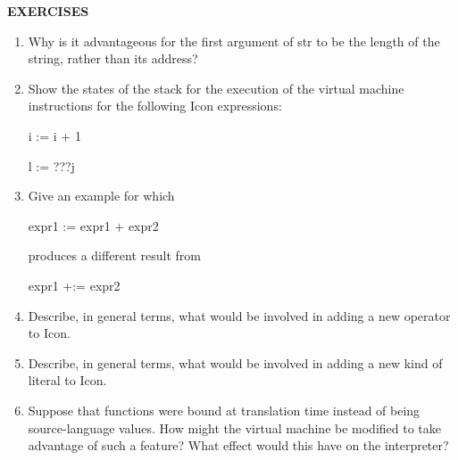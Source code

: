 {\sffamily\bfseries
EXERCISES}

\liststyleLvi
\begin{enumerate}
\item Why is it advantageous for the first argument of str to be the
length of the string, rather than its address?

\item Show the states of the stack for the execution of the virtual
machine instructions for the following Icon expressions:

   i := i + 1

   l := ???j

\item Give an example for which

expr1 := expr1 + expr2

produces a different result from

expr1 +:= expr2

\item Describe, in general terms, what would be involved in adding a
new operator to Icon.

\item Describe, in general terms, what would be involved in adding a
new kind of literal to Icon.

\item Suppose that functions were bound at translation time instead of
being source-language values. How might the virtual machine be
modified to take advantage of such a feature?  What effect would this
have on the interpreter?

\end{enumerate}
